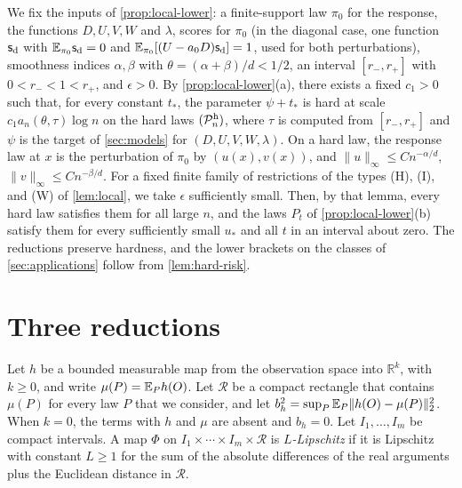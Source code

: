 We fix the inputs of \cref{prop:local-lower}: a finite-support
law $\pi_0$ for the response, the functions $D,U,V,W$ and $\lambda$,
scores for $\pi_0$ (in the diagonal case, one function $\mathsf s_{\rm d}$
with $\mathbb E_{\pi_0}\mathsf s_{\rm d}=0$ and
$\mathbb E_{\pi_0}[(U-a_0D)\mathsf s_{\rm d}]=1$, used for both perturbations),
smoothness indices $\alpha,\beta$ with $\theta=(\alpha+\beta)/d<1/2$, an
interval $[r_-,r_+]$ with $0<r_-<1<r_+$, and $\epsilon>0$. By
\cref{prop:local-lower}(a), there exists a fixed $c_1>0$ such
that, for every constant $t_*$, the parameter $\psi+t_*$ is hard at
scale $c_1a_n(\theta,\tau)\log n$ on the hard laws $(\mathcal P^{\rm h}_n)$,
where $\tau$ is computed from $[r_-,r_+]$ and $\psi$ is the target of
\cref{sec:models} for $(D,U,V,W,\lambda)$. On a hard law, the
response law at $x$ is the perturbation of $\pi_0$ by $(u(x),v(x))$, and
$\|u\|_\infty\le Cn^{-\alpha/d}$, $\|v\|_\infty\le Cn^{-\beta/d}$.
For a fixed finite family of restrictions of the types (H), (I),
and (W) of \cref{lem:local}, we take $\epsilon$ sufficiently small.
Then, by that lemma, every hard law satisfies them for
all large $n$, and the laws $P_t$ of
\cref{prop:local-lower}(b) satisfy them for every
sufficiently small $u_*$ and all $t$ in an interval about zero.
The reductions preserve hardness, and the lower brackets on the
classes of \cref{sec:applications} follow from
\cref{lem:hard-risk}.

\section{Three reductions}\label{sec:transfers}

Let $h$ be a bounded measurable map from the observation space into
$\mathbb R^k$, with $k\ge0$, and write $\mu(P)=\mathbb E_Ph(O)$. Let
$\mathcal R$ be a compact rectangle that contains $\mu(P)$ for every
law $P$ that we consider, and let
$b_h^2=\sup_P\mathbb E_P\|h(O)-\mu(P)\|_2^2$. When $k=0$, the terms with $h$
and $\mu$ are absent and $b_h=0$. Let $I_1,\ldots,I_m$ be compact
intervals. A map $\Phi$ on $I_1\times\cdots\times I_m\times\mathcal R$ is
\emph{$L$-Lipschitz} if it is Lipschitz with constant $L\ge1$ for the
sum of the absolute differences of the real arguments plus the
Euclidean distance in $\mathcal R$.


